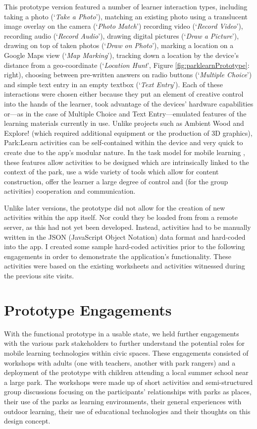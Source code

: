 This prototype version featured a number of learner interaction types, including taking a photo (`\textit{Take a Photo}'), matching an existing photo using a translucent image overlay on the camera (`\textit{Photo Match}') recording video (`\textit{Record Video}'), recording audio (`\textit{Record Audio}'), drawing digital pictures (`\textit{Draw a Picture}'), drawing on top of taken photos (`\textit{Draw on Photo}'), marking a location on a Google Maps view (`\textit{Map Marking}'), tracking down a location by the device’s distance from a geo-coordinate (`\textit{Location Hunt}', Figure \ref{fig:parklearnPrototype}: right), choosing between pre-written answers on radio buttons (`\textit{Multiple Choice}') and simple text entry in an empty textbox (`\textit{Text Entry}'). Each of these interactions were chosen either because they put an element of creative control into the hands of the learner, took advantage of the devices’ hardware capabilities or—as in the case of Multiple Choice and Text Entry—emulated features of the learning materials currently in use. Unlike projects such as Ambient Wood \citep{Rogers2004} and Explore! \citep{Costabile2008} (which required additional equipment or the production of 3D graphics), Park:Learn activities can be self-contained within the device and very quick to create due to the app’s modular nature. In the task model for mobile learning \citep{Sharples2013}, these features allow activities to be designed which are intrinsically linked to the context of the park, use a wide variety of tools which allow for content construction, offer the learner a large degree of control and (for the group activities) cooperation and communication. 

Unlike later versions, the prototype did not allow for the creation of new activities within the app itself. Nor could they be loaded from from a remote server, as this had not yet been developed. Instead, activities had to be manually written in the JSON (JavaScript Object Notation) data format and hard-coded into the app. I created some sample hard-coded activities prior to the following engagements in order to demonstrate the application's functionality. These activities were based on the existing worksheets and activities witnessed during the previous site visits.

\section{Prototype Engagements}

With the functional prototype in a usable state, we held further engagements with the various park stakeholders to further understand the potential roles for mobile learning technologies within civic spaces. These engagements consisted of workshops with adults (one with teachers, another with park rangers) and a deployment of the prototype with children attending a local summer school near a large park. The workshops were made up of short activities and semi-structured group discussions focusing on the participants’ relationships with parks as places, their use of the parks as learning environments, their general experiences with outdoor learning, their use of educational technologies and their thoughts on this design concept.

